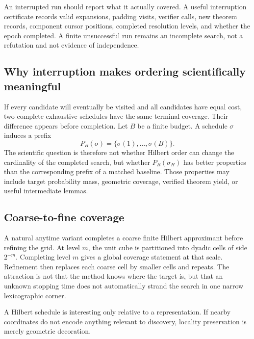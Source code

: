 \documentclass[11pt]{article}
\theoremstyle{hilberttheorem}
\begin{document}
An interrupted run should report what it actually covered. A useful interruption certificate records valid expansions, padding visits, verifier calls, new theorem records, component cursor positions, completed resolution levels, and whether the epoch completed. A finite unsuccessful run remains an incomplete search, not a refutation and not evidence of independence.

\subsection{Why interruption makes ordering scientifically meaningful}\label{subsec:interruption}
If every candidate will eventually be visited and all candidates have equal cost, two complete exhaustive schedules have the same terminal coverage. Their difference appears before completion. Let $B$ be a finite budget. A schedule $\sigma$ induces a prefix
\[
P_B(\sigma)=\{\sigma(1),\ldots,\sigma(B)\}.
\]
The scientific question is therefore not whether Hilbert order can change the cardinality of the completed search, but whether $P_B(\sigma_H)$ has better properties than the corresponding prefix of a matched baseline. Those properties may include target probability mass, geometric coverage, verified theorem yield, or useful intermediate lemmas.

\subsection{Coarse-to-fine coverage}\label{subsec:coarse-fine}
A natural anytime variant completes a coarse finite Hilbert approximant before refining the grid. At level $m$, the unit cube is partitioned into dyadic cells of side $2^{-m}$. Completing level $m$ gives a global coverage statement at that scale. Refinement then replaces each coarse cell by smaller cells and repeats. The attraction is not that the method knows where the target is, but that an unknown stopping time does not automatically strand the search in one narrow lexicographic corner.

\begin{tcolorbox}[colback=SoftGold,colframe=HilbertGold!80,arc=2mm,boxrule=.6pt,title={Interpretive rule}]
A Hilbert schedule is interesting only relative to a representation. If nearby coordinates do not encode anything relevant to discovery, locality preservation is merely geometric decoration.
\end{tcolorbox}
\end{document}
